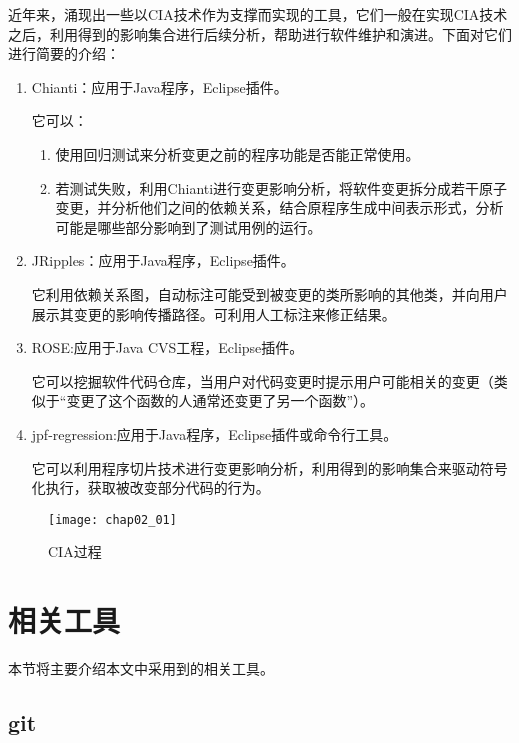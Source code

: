 近年来，涌现出一些以CIA技术作为支撑而实现的工具，它们一般在实现CIA技术之后，利用得到的影响集合进行后续分析，帮助进行软件维护和演进。下面对它们进行简要的介绍：
\begin{enumerate}
	\item Chianti：应用于Java程序，Eclipse插件\cite{ren2004chianti}。

	它可以：
	\begin{enumerate}
	
		\item 使用回归测试来分析变更之前的程序功能是否能正常使用。
		\item 若测试失败，利用Chianti进行变更影响分析，将软件变更拆分成若干原子变更，并分析他们之间的依赖关系，结合原程序生成中间表示形式，分析可能是哪些部分影响到了测试用例的运行。
	\end{enumerate}
	
	
	\item JRipples：应用于Java程序，Eclipse插件\cite{buckner2005jripples,rajlich2004incremental}。
	
	它利用依赖关系图，自动标注可能受到被变更的类所影响的其他类，并向用户展示其变更的影响传播路径。可利用人工标注来修正结果。
	
	\item ROSE:应用于Java CVS工程，Eclipse插件\cite{zimmermann2005mining}。

	它可以挖掘软件代码仓库，当用户对代码变更时提示用户可能相关的变更（类似于“变更了这个函数的人通常还变更了另一个函数”）。
	
	
	\item jpf-regression:应用于Java程序，Eclipse插件或命令行工具\cite{person2011directed}。

	它可以利用程序切片技术进行变更影响分析，利用得到的影响集合来驱动符号化执行，获取被改变部分代码的行为。
\end{enumerate}

\begin{figure}[H]
	\centering
	\texttt{[image: chap02\_01]}
	\caption {CIA过程}
\end{figure}

\section{相关工具}
	本节将主要介绍本文中采用到的相关工具。
	

	\subsection{git}		

